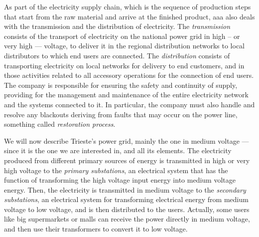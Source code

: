 As part of the electricity supply chain,
which is the sequence of production steps that start from the raw material and arrive at the finished product, %
\acrshort{aaa} also deals with the transmission and the distribution of electricity. The \emph{transmission} consists of the transport of electricity on the national power grid in high -- or very high --- voltage, to deliver it in the regional distribution networks to local distributors to which end users are connected. The \emph{distribution} consists of transporting electricity on local networks for delivery to end customers, and in those activities related to all accessory operations for the connection of end users. The company is responsible for ensuring the safety and continuity of supply, providing for the management and maintenance of the entire electricity network and the systems connected to it. In particular, the company must also handle and resolve any blackouts deriving from faults that may occur on the power line, something called \emph{restoration process}.

We will now describe Trieste's power grid, mainly the one in medium voltage --- since it is the one we are interested in, and all its elements.  The electricity produced from different primary sources of energy is transmitted in high or very high voltage to the \emph{primary substations}, an electrical system that has the function of transforming the high voltage input energy into medium voltage energy. Then, the electricity is transmitted in medium voltage to the \emph{secondary substations}, an electrical system for transforming electrical energy from medium voltage to low voltage, and is then distributed to the users. Actually, some users like big supermarkets or malls can receive the power directly in medium voltage, and then use their transformers to convert it to low voltage.

